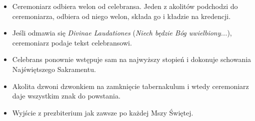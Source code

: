 \begin{itemize}
			\item Ceremoniarz odbiera welon od celebransa. Jeden z akolitów podchodzi do ceremoniarza, odbiera od niego welon, składa go i kładzie na kredencji.
			\item Jeśli odmawia się \textit{Divinae Laudationes} (\textit{Niech będzie Bóg uwielbiony...}), ceremoniarz podaje tekst celebransowi.
			\item Celebrans ponownie wstępuje sam na najwyższy stopień i dokonuje schowania Najświętszego Sakramentu.
			\item Akolita dzwoni dzwonkiem na zamknięcie tabernakulum i wtedy ceremoniarz daje wszystkim znak do powstania.
			\item Wyjście z prezbiterium jak zawsze po każdej Mszy Świętej.
		\end{itemize}